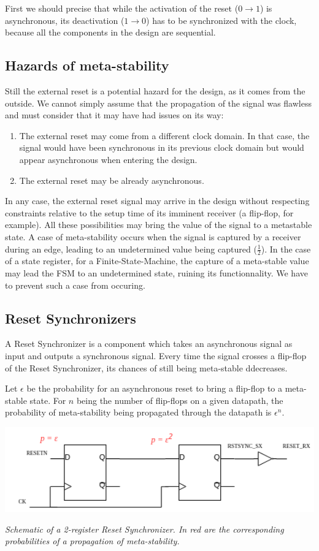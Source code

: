 \documentclass[a4paper]{article}
\begin{document}
First we should precise that while the activation of the reset ($0 \rightarrow 1$) is asynchronous,
its deactivation ($1 \rightarrow 0$) has to be synchronized with the clock, because all
the components in the design are sequential.

\subsection{Hazards of meta-stability}
Still the external reset is a potential hazard for the design, as it comes from the outside. We cannot
simply assume that the propagation of the signal was flawless and must consider that it may have
had issues on its way:
\begin{enumerate}
  \item The external reset may come from a different clock domain. In that case, the signal would have
  been synchronous in its previous clock domain but would appear asynchronous when entering the design.
  \item The external reset may be already asynchronous.
\end{enumerate}
In any case, the external reset signal may arrive in the design without respecting constraints relative
to the setup time of its imminent receiver (a flip-flop, for example). All these possibilities may bring
the value of the signal to a metastable state. A case of meta-stability occurs when the signal is captured by a receiver
during an edge, leading to an undetermined value being captured ($\frac{1}{2}$). In the case of a state register, for a
Finite-State-Machine, the capture of a meta-stable value may lead the FSM to an undetermined state, ruining its
functionnality. We have to prevent such a case from occuring.

\subsection{Reset Synchronizers}
A Reset Synchronizer is a component which takes an asynchronous signal as input and outputs a synchronous signal. Every
time the signal crosses a flip-flop of the Reset Synchronizer, its chances of still being meta-stable ddecreases.

Let $\epsilon$ be the probability for an asynchronous reset to bring a flip-flop to a meta-stable state.
For $n$ being the number of flip-flops on a given datapath, the probability of meta-stability being propagated
through the datapath is $\epsilon^n$.

\includegraphics[width=15cm]{./reset_synchronizer.png}
\begin{center}
  {\it Schematic of a 2-register Reset Synchronizer. In red are the corresponding probabilities of a
  propagation of meta-stability.}
\end{center}
\end{document}
